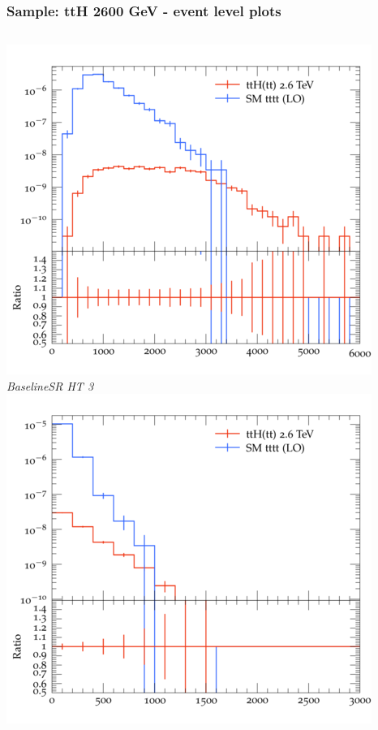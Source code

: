 \documentclass{beamer}
\begin{document}
\begin{frame}
\frametitle{Sample: ttH 2600 GeV - event level plots}
\begin{columns}
\includegraphics[width=\textwidth]{../plots/ttH_2600/tttt_ttH_1LOS/BaselineSR_HT_3.png}\\
\textit{\small BaselineSR HT 3}
\includegraphics[width=\textwidth]{../plots/ttH_2600/tttt_ttH_1LOS/BaselineSR_MET.png}\\

\end{columns}
\end{frame}
\end{document}
